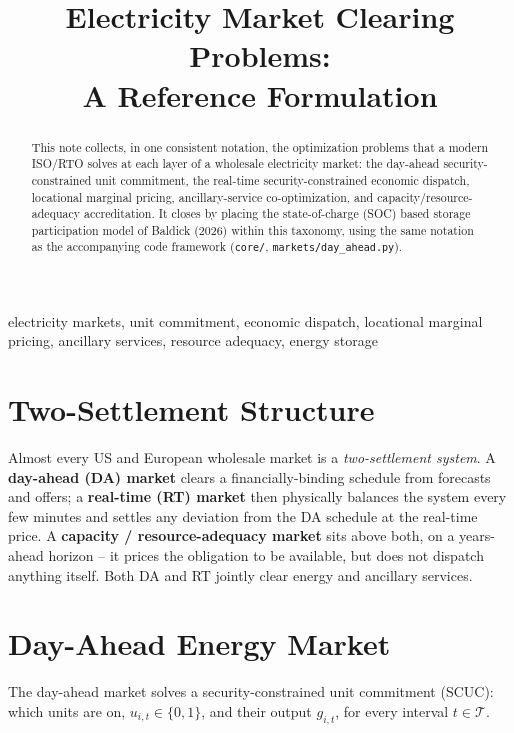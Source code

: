 \documentclass[10pt,conference]{IEEEtran}
\begin{document}
\title{Electricity Market Clearing Problems:\\ A Reference Formulation}

\author{
}

\maketitle

\begin{abstract}
This note collects, in one consistent notation, the optimization problems that a modern
ISO/RTO solves at each layer of a wholesale electricity market: the day-ahead
security-constrained unit commitment, the real-time security-constrained economic dispatch,
locational marginal pricing, ancillary-service co-optimization, and capacity/resource-adequacy
accreditation. It closes by placing the state-of-charge (SOC) based storage participation
model of Baldick (2026) within this taxonomy, using the same notation as the accompanying
code framework (\texttt{core/}, \texttt{markets/day\_ahead.py}).
\end{abstract}

\begin{IEEEkeywords}
electricity markets, unit commitment, economic dispatch, locational marginal pricing,
ancillary services, resource adequacy, energy storage
\end{IEEEkeywords}

\section{Two-Settlement Structure}
Almost every US and European wholesale market is a \emph{two-settlement system}. A
\textbf{day-ahead (DA) market} clears a financially-binding schedule from forecasts and
offers; a \textbf{real-time (RT) market} then physically balances the system every few
minutes and settles any deviation from the DA schedule at the real-time price. A
\textbf{capacity / resource-adequacy market} sits above both, on a years-ahead horizon --
it prices the obligation to be available, but does not dispatch anything itself. Both DA
and RT jointly clear energy and ancillary services.

\section{Day-Ahead Energy Market}
The day-ahead market solves a security-constrained unit commitment (SCUC): which units
are on, $u_{i,t}\in\{0,1\}$, and their output $g_{i,t}$, for every interval $t\in\mathcal T$.
\end{document}

